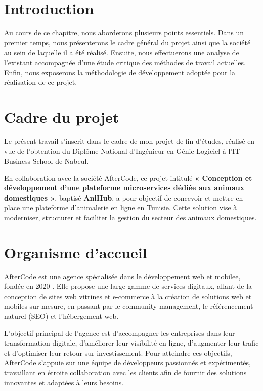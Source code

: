 \section{Introduction} 
Au cours de ce chapitre, nous aborderons plusieurs points essentiels. Dans un premier temps, nous présenterons le cadre général du projet ainsi que la société au sein de laquelle il a été réalisé. Ensuite, nous effectuerons une analyse de l’existant accompagnée d’une étude critique des méthodes de travail actuelles. Enfin, nous exposerons la méthodologie de développement adoptée pour la réalisation de ce projet. 

\section{Cadre du projet} 
Le présent travail s’inscrit dans le cadre de mon projet de fin d’études, réalisé en vue de l’obtention du Diplôme National d’Ingénieur en Génie Logiciel à l’IT Business School de Nabeul.

En collaboration avec la société AfterCode, ce projet intitulé \textbf{« Conception et développement d’une plateforme microservices dédiée aux animaux domestiques »}, baptisé \textbf{AniHub}, a pour objectif de concevoir et mettre en place une plateforme d’animalerie en ligne en Tunisie. Cette solution vise à moderniser, structurer et faciliter la gestion du secteur des animaux domestiques. 

\section{Organisme d’accueil}

AfterCode est une agence spécialisée dans le développement web et mobilee, fondée en 2020 . Elle propose une large gamme de services digitaux, allant de la conception de sites web vitrines et e-commerce à la création de solutions web et mobiles sur mesure, en passant par le community management, le référencement naturel (SEO) et l’hébergement web.

L’objectif principal de l’agence est d’accompagner les entreprises dans leur transformation digitale, d’améliorer leur visibilité en ligne, d’augmenter leur trafic et d’optimiser leur retour sur investissement. Pour atteindre ces objectifs, AfterCode s’appuie sur une équipe de développeurs passionnés et expérimentés, travaillant en étroite collaboration avec les clients afin de fournir des solutions innovantes et adaptées à leurs besoins.
\newpage

